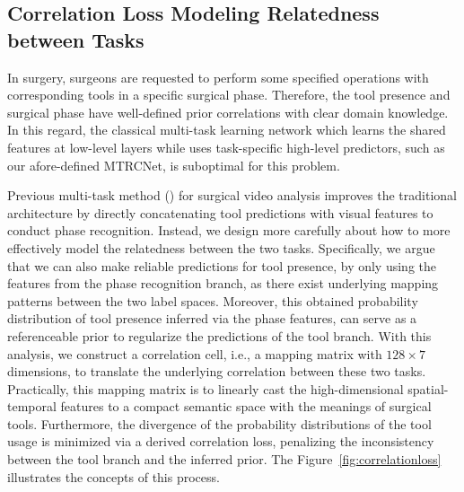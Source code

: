 \documentclass{elsarticle}
\begin{document}
\subsection{Correlation Loss Modeling Relatedness between Tasks}
In surgery, surgeons are requested to perform some specified operations with corresponding tools in a specific surgical phase.
Therefore, the tool presence and surgical phase have well-defined prior correlations with clear domain knowledge.
In this regard, the classical multi-task learning network which learns the shared features at low-level layers while uses task-specific high-level predictors, such as our afore-defined MTRCNet, is suboptimal for this problem.


Previous multi-task method (\cite{twinanda2017endonet}) for surgical video analysis improves the traditional architecture by directly concatenating tool predictions with visual features to conduct phase recognition.
Instead, we design more carefully about how to more effectively model the relatedness between the two tasks.
Specifically, we argue that we can also make reliable predictions for tool presence, by only using the features from the phase recognition branch, as there exist underlying mapping patterns between the two label spaces.
Moreover, this obtained probability distribution of tool presence inferred via the phase features, can serve as a referenceable prior to regularize the predictions of the tool branch.
With this analysis, we construct a correlation cell, i.e., a mapping matrix with $128 \times 7$ dimensions, to translate the underlying correlation between these two tasks. 
Practically, this mapping matrix is to linearly cast the high-dimensional spatial-temporal features to a compact semantic space with the meanings of surgical tools. 
Furthermore, the divergence of the probability distributions of the tool usage is minimized via a derived correlation loss,
penalizing the inconsistency between the tool branch and the inferred prior.
The Figure~\ref{fig:correlationloss} illustrates the concepts of this process.
\end{document}
